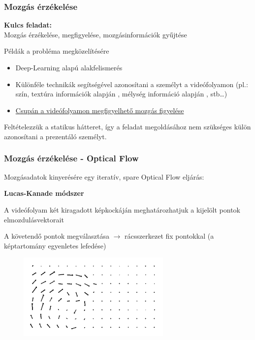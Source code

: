 \documentclass{beamer}
\begin{document}
\begin{frame}[fragile]
\frametitle{Mozgás érzékelése}

\textbf{Kulcs feladat:}\\
Mozgás érzékelése, megfigyelése, mozgásinformációk gyűjtése

\medskip

\begin{block}{Példák a probléma megközelítésére}
\begin{itemize}
	\item Deep-Learning alapú alakfelismerés \cite{cao2018openpose}
	\item Különféle technikák segítségével azonosítani a személyt a videófolyamon (pl.: szín, textúra információk alapján \cite{fadhil2018trackingsurvey}, mélység információ alapján \cite{tang2018structured}, stb\ldots) 
	\item \underline{Csupán a videófolyamon megfigyelhető mozgás figyelése}
\end{itemize}
\end{block}

\bigskip

Feltételezzük a statikus hátteret, így a feladat megoldásához nem szükséges külön azonosítani a prezentáló személyt.

\end{frame}

\begin{frame}[fragile]
\frametitle{Mozgás érzékelése - Optical Flow}

Mozgásadatok kinyerésére egy iteratív, spare Optical Flow eljárás:

\medskip

\textbf{Lucas-Kanade módszer} \cite{lucas1981iterative}

A videófolyam két kiragadott képkockáján meghatározhatjuk a kijelölt pontok elmozdulásvektorait

\medskip

A követendő pontok megválasztása $\rightarrow$ rácsszerkezet fix pontokkal (a képtartomány egyenletes lefedése)

\begin{figure}[htb]
	\includegraphics[width=7.5cm]{images/vectorField.png}
\end{figure}

\end{frame}
\end{document}
